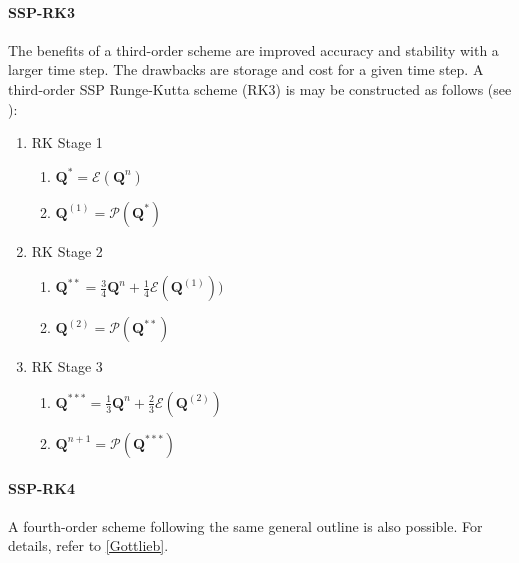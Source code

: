 \documentclass[11pt]{article}
\begin{document}
\paragraph{SSP-RK3} The benefits of a third-order scheme are improved accuracy and stability with a larger time step.  The drawbacks are storage and cost for a given time step.  A third-order SSP Runge-Kutta scheme (RK3) is may be constructed as follows (see \cite{Shu}):

\begin{enumerate}
\item RK Stage 1
    \begin{enumerate}
    \item $\mathbf{Q}^{*} = \mathcal{E}(\mathbf{Q}^n)$
    \item $\mathbf{Q}^{(1)} = \mathcal{P}(\mathbf{Q}^*)$
    \end{enumerate}
\item RK Stage 2
    \begin{enumerate}
    \item $\mathbf{Q}^{**} = \mbox{$\frac{3}{4}$} \mathbf{Q}^n + \mbox{$\frac{1}{4}$}\mathcal{E}(\mathbf{Q}^{(1)}))$
    \item $\mathbf{Q}^{(2)} = \mathcal{P}(\mathbf{Q}^{**})$
    \end{enumerate}
\item RK Stage 3
    \begin{enumerate}
    \item $\mathbf{Q}^{***} = \mbox{$\frac{1}{3}$} \mathbf{Q}^n + \mbox{$\frac{2}{3}$}\mathcal{E}(\mathbf{Q}^{(2)})$
    \item $\mathbf{Q}^{n+1} = \mathcal{P}(\mathbf{Q}^{***})$
    \end{enumerate}
\end{enumerate}

\paragraph{SSP-RK4} A fourth-order scheme following the same general outline is also possible.  For details, refer to \ref{Gottlieb}.
\end{document}
